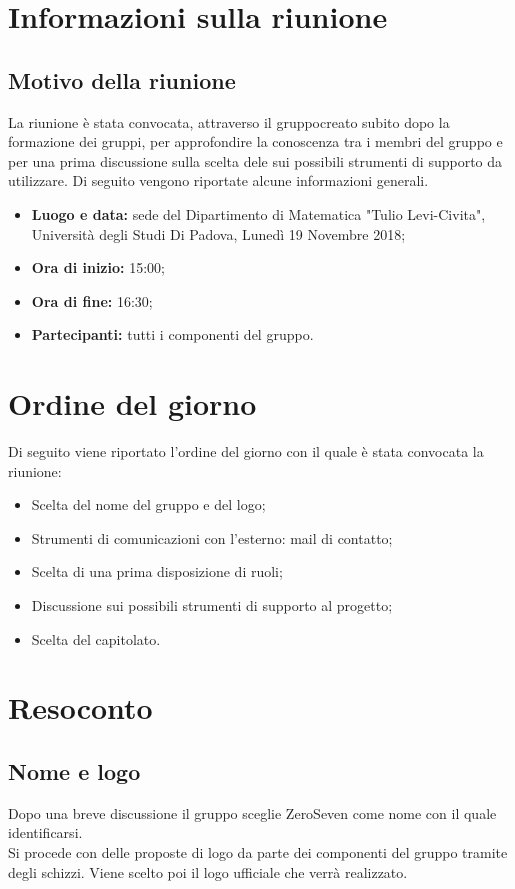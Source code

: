\documentclass[a4paper,12pt]{article}
\begin{document}
	\cleardoublepage
	\pagestyle{mymain}
	
	\tableofcontents
	\cleardoublepage
	
	\section{Informazioni sulla riunione}
	\subsection{Motivo della riunione}
	La riunione è stata convocata, attraverso il gruppocreato subito dopo la formazione dei gruppi, per approfondire la conoscenza tra i membri del gruppo e per una prima discussione sulla scelta dele sui possibili strumenti di supporto da utilizzare. 
	Di seguito vengono riportate alcune informazioni generali.
	\begin{itemize}
		\item \textbf{Luogo e data:} sede del Dipartimento di Matematica "Tulio Levi-Civita", Università degli Studi Di Padova, Lunedì 19 Novembre 2018;
		\item \textbf{Ora di inizio:} 15:00;
		\item \textbf{Ora di fine:} 16:30;
		\item \textbf{Partecipanti:} tutti i componenti del gruppo.
	\end{itemize}
	\section{Ordine del giorno}
	Di seguito viene riportato l'ordine del giorno con il quale è stata convocata la riunione:
	\begin{itemize}
		\item Scelta del nome del gruppo e del logo;
		\item Strumenti di comunicazioni con l'esterno: mail di contatto;
		\item Scelta di una prima disposizione di ruoli;
		\item Discussione sui possibili strumenti di supporto al progetto;
		\item Scelta del capitolato.
	\end{itemize}
	\section{Resoconto}
	\subsection{Nome e logo}
	Dopo una breve discussione il gruppo sceglie ZeroSeven come nome con il quale identificarsi.\\
	Si procede con delle proposte di logo da parte dei componenti del gruppo tramite degli schizzi. Viene scelto poi il logo ufficiale che verrà realizzato.
\end{document}

